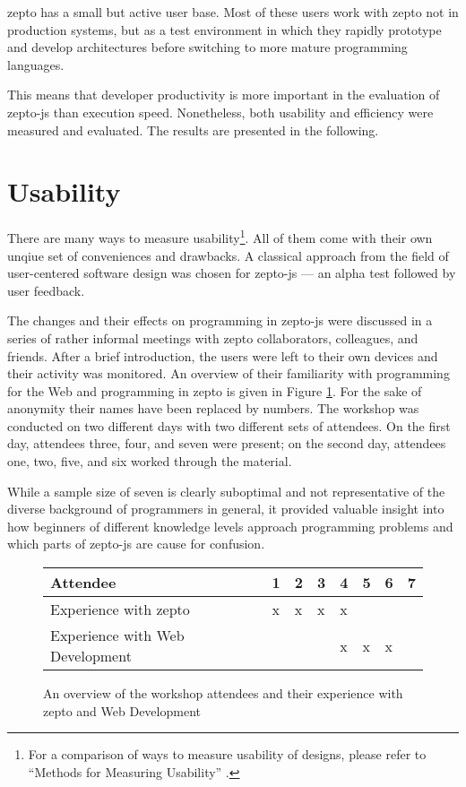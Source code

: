 \documentclass[oneside,11pt,xetex]{scrbook}
\begin{document}
zepto has a small but active user base. Most of these users work with zepto
not in production systems, but as a test environment in which they rapidly
prototype and develop architectures before switching to more mature programming
languages.

This means that developer productivity is more important in the evaluation of
zepto-js than execution speed. Nonetheless, both usability and efficiency
were measured and evaluated. The results are presented in the following.

\section{Usability}

There are many ways to measure usability\footnote{For a comparison of ways
to measure usability of designs, please refer to ``Methods for Measuring
Usability'' \parencite{USBL}.}. All of them come with their own unqiue set
of conveniences and drawbacks. A classical approach from the field of
user-centered software design was chosen for zepto-js --- an alpha test
followed by user feedback.

The changes and their effects on programming in zepto-js were discussed in
a series of rather informal meetings with zepto collaborators, colleagues,
and friends. After a brief introduction, the users were left to their own
devices and their activity was monitored. An overview of their familiarity
with programming for the Web and programming in zepto is given in Figure
\ref{fig:attendees}. For the sake of anonymity their names have been replaced
by numbers. The workshop was conducted on two different days with two different
sets of attendees. On the first day, attendees three, four, and seven were present;
on the second day, attendees one, two, five, and six worked through the material.

While a sample size of seven is clearly suboptimal and not representative
of the diverse background of programmers in general, it provided valuable
insight into how beginners of different knowledge levels approach
programming problems and which parts of zepto-js are cause for confusion.

\begin{figure}
\centering
  \begin{tabu}{| l | l | l | l | l | l | l | l |}
  \hline
  \rowfont{\footnotesize}
  Attendee                        & 1 & 2 & 3 & 4 & 5 & 6 & 7 \\ \hline
  \rowfont{\footnotesize}
  Experience with zepto           & x & x & x & x &   &   &   \\ \hline
  \rowfont{\footnotesize}
  Experience with Web Development &   &   &   & x & x & x &   \\ \hline
  \end{tabu}
  \caption{An overview of the workshop attendees and their experience with zepto and Web Development}
\label{fig:attendees}
\end{figure}
\end{document}
